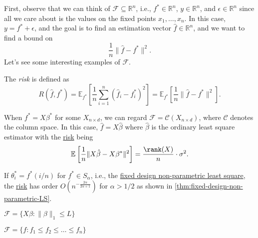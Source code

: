 First, observe that we can think of \(\mathscr{F} \subseteq \mathbb{R} ^n\), i.e., \(f^{\ast} \in \mathbb{R} ^n\), \(y\in \mathbb{R} ^n\), and \(\epsilon \in \mathbb{R} ^n\) since all we care about is the values on the fixed points \(x_1, \dots , x_n\). In this case, \(y = f^{\ast} + \epsilon \), and the goal is to find an estimation vector \(\hat{f} \in \mathbb{R} ^n\), and we want to find a bound on
\[
	\frac{1}{n} \lVert \hat{f} - f^{\ast} \rVert ^2.
\]
Let's see some interesting examples of \(\mathscr{F} \).

\begin{notation}[Risk]\label{not:risk}
	The \emph{risk} is defined as
	\[
		R(\hat{f} , f^{\ast} )
		= \mathbb{E}_{f^{\ast} }\left[ \frac{1}{n} \sum_{i=1}^{n} (\hat{f} _i - f^{\ast} _i)^2 \right]
		= \mathbb{E}_{f^{\ast} }\left[ \frac{1}{n} \lVert \hat{f} - f^{\ast} \rVert ^2 \right] .
	\]
\end{notation}

\begin{eg}
	When \(f^{\ast} = X \beta ^{\ast} \) for some \(X_{n \times d}\), we can regard \(\mathscr{F} = \mathcal{C} (X_{n\times d})\), where \(\mathcal{C} \) denotes the column space. In this case, \(\hat{f} = X \hat{\beta} \) where \(\hat{\beta} \) is the ordinary least square estimator with the \hyperref[not:risk]{risk} being
	\[
		\mathbb{E}_{}\left[\frac{1}{n} \lVert X \hat{\beta} - X \beta ^{\ast} \rVert ^2 \right] = \frac{\rank (X)}{n} \cdot \sigma ^2.
	\]
\end{eg}

\begin{eg}
	If \(\theta ^{\ast} _i = f^{\ast} (i / n)\) for \(f^{\ast} \in S_\alpha \), i.e., the \hyperref[prb:fixed-design-non-parametric-LS]{fixed design non-parametric least square}, the \hyperref[not:risk]{risk} has order \(O(n^{- \frac{2\alpha }{2\alpha + 1}})\) for \(\alpha > 1 / 2\) as shown in \autoref{thm:fixed-design-non-parametric-LS}.
\end{eg}

\begin{eg}
	\(\mathscr{F} = \{ X \beta \colon \lVert \beta \rVert _1 \leq L \} \)
\end{eg}

\begin{eg}
	\(\mathscr{F} = \{f \colon f_1 \leq f_2 \leq \dots \leq f_n \} \)
\end{eg}

